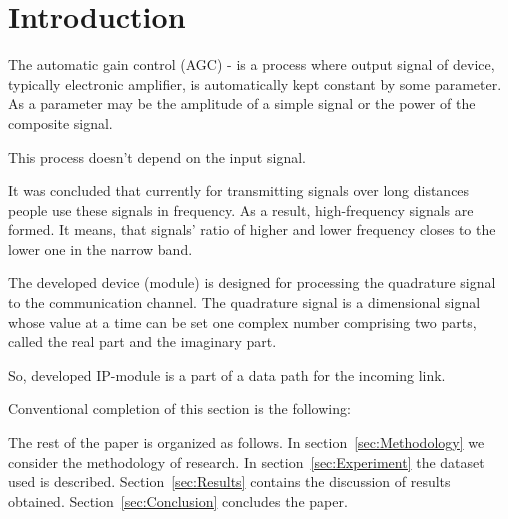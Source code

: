 \section{Introduction}
\label{sec:Intro}


	The automatic gain control (AGC) - is a process where output signal of device, typically electronic amplifier, is automatically kept constant by some parameter. As a parameter may be the amplitude of a simple signal or the power of the composite signal. 
	
	
	This process doesn't depend on the input signal.
	
	

	It was concluded that currently for transmitting signals over long distances people use these signals in frequency. As a result, high-frequency signals are formed. It means, that signals' ratio of higher and lower frequency closes to the lower one in the narrow band.
	
	
	The developed device (module) is designed for processing the quadrature signal to the communication channel. The quadrature signal is a dimensional signal whose value at a time can be set one complex number comprising two parts, called the real part and the imaginary part. 
	
	So, developed IP-module is a part of a data path for the incoming link.

	Conventional completion of this section is the following:

	The rest of the paper is organized as follows. In section~\ref{sec:Methodology} we consider the methodology of research. In section~\ref{sec:Experiment} the dataset used is described. Section~\ref{sec:Results} contains the discussion of results obtained. Section~\ref{sec:Conclusion} concludes the paper.